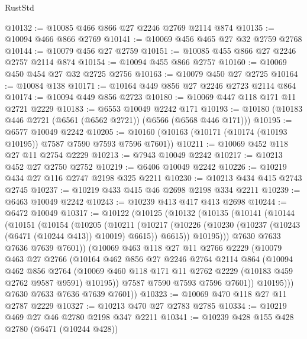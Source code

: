 \begin{lexlean}{RustStd}
\begin{coremodule}
{\begin{coremodule}
{{{{{{{{{{{{{{{{{{{{{{{{{{@10132 := @10085 @466 @866 @27 @2246 @2769 @2114 @874
@10135 := @10094 @466 @866 @2769
@10141 := @10069 @456 @465 @27 @32 @2759 @2768
@10144 := @10079 @456 @27 @2759
@10151 := @10085 @455 @866 @27 @2246 @2757 @2114 @874
@10154 := @10094 @455 @866 @2757
@10160 := @10069 @450 @454 @27 @32 @2725 @2756
@10163 := @10079 @450 @27 @2725
@10164 := @10084 @138
@10171 := @10164 @449 @856 @27 @2246 @2723 @2114 @864
@10174 := @10094 @449 @856 @2723
@10180 := @10069 @447 @118 @171 @11 @2721 @2229
@10183 := @6553 @10049 @2242 @171
@10193 := @10180 (@10183 @446 @2721 (@6561 (@6562 @2721)) (@6566 (@6568 @446 @171)))
@10195 := @6577 @10049 @2242
@10205 := @10160 (@10163 (@10171 (@10174 (@10193 @10195)) @7587 @7590 @7593 @7596 @7601))
@10211 := @10069 @452 @118 @27 @11 @2754 @2229
@10213 := @7943 @10049 @2242
@10217 := @10213 @452 @27 @2750 @2752
@10219 := @6406 @10049 @2242
@10226 := @10219 @434 @27 @116 @2747 @2198 @325 @2211
@10230 := @10213 @434 @415 @2743 @2745
@10237 := @10219 @433 @415 @46 @2698 @2198 @334 @2211
@10239 := @6463 @10049 @2242
@10243 := @10239 @413 @417 @413 @2698
@10244 := @6472 @10049
@10317 := @10122
    (@10125
      (@10132
        (@10135
          (@10141
            (@10144
              (@10151
                (@10154
                  (@10205
                    (@10211
                      (@10217
                        (@10226
                          (@10230 (@10237 (@10243 (@6471 (@10244 @413)) @10019) @6615))
                          @6615))
                      @10195)))
                @7630
                @7633
                @7636
                @7639
                @7601))
            (@10069
              @463
              @118
              @27
              @11
              @2766
              @2229
              (@10079
                @463
                @27
                @2766
                (@10164
                  @462
                  @856
                  @27
                  @2246
                  @2764
                  @2114
                  @864
                  (@10094
                    @462
                    @856
                    @2764
                    (@10069 @460 @118 @171 @11 @2762 @2229 (@10183 @459 @2762 @9587 @9591) @10195))
                  @7587
                  @7590
                  @7593
                  @7596
                  @7601))
              @10195)))
        @7630
        @7633
        @7636
        @7639
        @7601))
@10323 := @10069 @470 @118 @27 @11 @2787 @2229
@10327 := @10213 @470 @27 @2783 @2785
@10334 := @10219 @469 @27 @46 @2780 @2198 @347 @2211
@10341 := @10239 @428 @155 @428 @2780 (@6471 (@10244 @428))
}}}}}}}}}}}}}}}}}}}}}}}}}}
\end{coremodule}}
\end{coremodule}
\end{lexlean}
